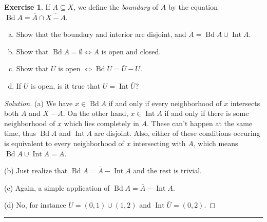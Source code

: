 \documentclass{article}
\theoremstyle{definition}
\newtheorem{exercise}{Exercise}[section]
\DeclareMathOperator{\Bd}{\mathrm{Bd}}
\DeclareMathOperator{\Int}{\mathrm{Int}}
\begin{document}
\begin{exercise}
  If $A\subseteq X$, we define the \textit{boundary} of $A$ by the equation $\Bd A = \overline{A}\cap\overline{X - A}$.
  \begin{enumerate}[(a)]
    \item Show that the boundary and interior are disjoint, and $\bar{A} = \Bd A \cup \Int A$.
    \item Show that $\Bd A = \emptyset\iff A$ is open and closed.
    \item Show that $U$ is open $\iff \Bd U = \bar{U} - U$.
    \item If $U$ is open, is it true that $U = \Int\bar{U}$?
  \end{enumerate}
\end{exercise}
\begin{proof}[Solution]
  (a) We have $x\in\Bd A$ if and only if every neighborhood of $x$ intersects both $A$ and $X - A$. On the other hand, $x\in\Int A$ if and only if there is some neighborhood of $x$ which lies completely in $A$. These can't happen at the same time, thus $\Bd A$ and $\Int A$ are disjoint. Also, either of these conditions occuring is equivalent to every neighborhood of $x$ intersecting with $A$, which means $\Bd A \cup \Int A = \bar{A}$.

  (b) Just realize that $\Bd A = \bar{A} - \Int A$ and the rest is trivial.

  (c) Again, a simple application of $\Bd A = \bar{A} - \Int A$.

  (d) No, for instance $U = (0,1)\cup(1,2)$ and $\Int\bar{U} = (0,2)$.
\end{proof}

\hrule
\end{document}
